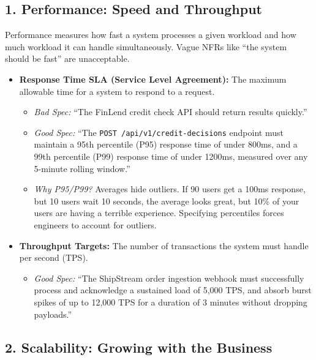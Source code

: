 \documentclass[
  11pt,
  openany,
  oneside]{book}
\providecommand{\tightlist}{%
  \setlength{\itemsep}{0pt}\setlength{\parskip}{0pt}}
\begin{document}
\subsection{1. Performance: Speed and
Throughput}\label{performance-speed-and-throughput}

Performance measures how fast a system processes a given workload and
how much workload it can handle simultaneously. Vague NFRs like ``the
system should be fast'' are unacceptable.

\begin{itemize}
\tightlist
\item
  \textbf{Response Time SLA (Service Level Agreement):} The maximum
  allowable time for a system to respond to a request.

  \begin{itemize}
  \tightlist
  \item
    \emph{Bad Spec:} ``The FinLend credit check API should return
    results quickly.''
  \item
    \emph{Good Spec:} ``The \texttt{POST\ /api/v1/credit-decisions}
    endpoint must maintain a 95th percentile (P95) response time of
    under 800ms, and a 99th percentile (P99) response time of under
    1200ms, measured over any 5-minute rolling window.''
  \item
    \emph{Why P95/P99?} Averages hide outliers. If 90 users get a 100ms
    response, but 10 users wait 10 seconds, the average looks great, but
    10\% of your users are having a terrible experience. Specifying
    percentiles forces engineers to account for outliers.
  \end{itemize}
\item
  \textbf{Throughput Targets:} The number of transactions the system
  must handle per second (TPS).

  \begin{itemize}
  \tightlist
  \item
    \emph{Good Spec:} ``The ShipStream order ingestion webhook must
    successfully process and acknowledge a sustained load of 5,000 TPS,
    and absorb burst spikes of up to 12,000 TPS for a duration of 3
    minutes without dropping payloads.''
  \end{itemize}
\end{itemize}

\subsection{2. Scalability: Growing with the
Business}\label{scalability-growing-with-the-business}
\end{document}
